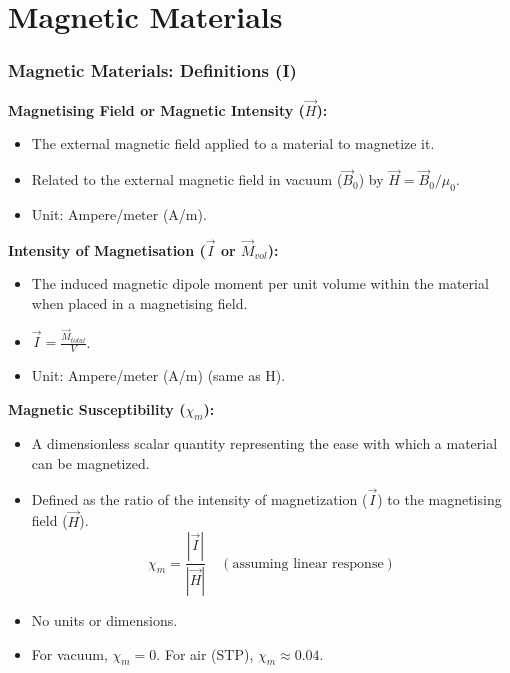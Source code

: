 \section{Magnetic Materials}

\transfade[duration=0.5]

\begin{frame}[t]
    \frametitle{\textcolor{deepnavy}{\textbf{Magnetic Materials: Definitions (I)}}}
    \renewcommand{\familydefault}{\rmdefault}
    \small

      \item<+-> \textbf{Magnetising Field or Magnetic Intensity ($\vec{H}$):}
        \begin{itemize}
              \item The external magnetic field applied to a material to magnetize it.
              \item Related to the external magnetic field in vacuum ($\vec{B}_0$) by $\vec{H} = \vec{B}_0 / \mu_0$.
              \item Unit: Ampere/meter (A/m).
        \end{itemize}

      \item<+-> \textbf{Intensity of Magnetisation ($\vec{I}$ or $\vec{M}_{vol}$):}
        \begin{itemize}
              \item The induced magnetic dipole moment per unit volume within the material when placed in a magnetising field.
              \item $\vec{I} = \frac{\vec{M}_{total}}{V}$.
              \item Unit: Ampere/meter (A/m) (same as H).
        \end{itemize}

      \item<+-> \textbf{Magnetic Susceptibility ($\chi_m$):}
        \begin{itemize}
              \item A dimensionless scalar quantity representing the ease with which a material can be magnetized.
              \item Defined as the ratio of the intensity of magnetization ($\vec{I}$) to the magnetising field ($\vec{H}$).
              \begin{equation*} \chi_m = \frac{|\vec{I}|}{|\vec{H}|} \quad (\text{assuming linear response}) \end{equation*}
              \item No units or dimensions.
              \item For vacuum, $\chi_m = 0$.   For air (STP), $\chi_m \approx 0.04$.
        \end{itemize}
\end{frame}

